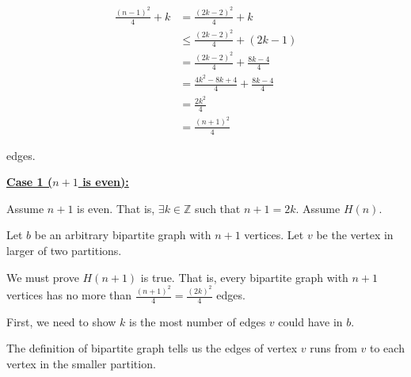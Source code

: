 \documentclass[12pt]{article}
\begin{document}
\begin{enumerate}[a.]
\begin{mdframed}
\begin{enumerate}[1.]
\begin{enumerate}[1.]
\begin{itemize}
\begin{mdframed}
                    \begin{align}
                        \frac{(n-1)^2}{4} + k &=\frac{(2k-2)^2}{4} + k\\
                        &\leq \frac{(2k-2)^2}{4} + (2k - 1)\\
                        &= \frac{(2k-2)^2}{4} + \frac{8k - 4}{4}\\
                        &= \frac{4k^2 - 8k + 4}{4} + \frac{8k - 4}{4}\\
                        &= \frac{2k^2}{4}\\
                        &= \frac{(n+1)^2}{4}
                    \end{align}

                    edges.
                    \end{mdframed}

                \end{itemize}

                \bigskip

                \begin{mdframed}

                \underline{\textbf{Case 1 ($n+1$ is even):}}

                \bigskip

                Assume $n+1$ is even. That is, $\exists k \in \mathbb{Z}$ such that
                $n+1 = 2k$. Assume $H(n)$.

                \bigskip

                Let $b$ be an arbitrary bipartite graph with $n+1$ vertices. Let
                $v$ be the vertex in larger of two partitions.

                \bigskip

                We must prove $H(n+1)$ is true. That is, every bipartite graph
                with $n+1$ vertices has no more than $\frac{(n+1)^2}{4} = \frac{(2k)^2}{4}$
                edges.

                \bigskip

                First, we need to show $k$ is the most number of edges $v$
                could have in $b$.

                \bigskip

                The definition of bipartite graph tells us the edges of vertex
                $v$ runs from $v$ to each vertex in the smaller partition.

                \bigskip


\end{mdframed}
\end{enumerate}
\end{enumerate}
\end{mdframed}
\end{enumerate}
\end{document}

